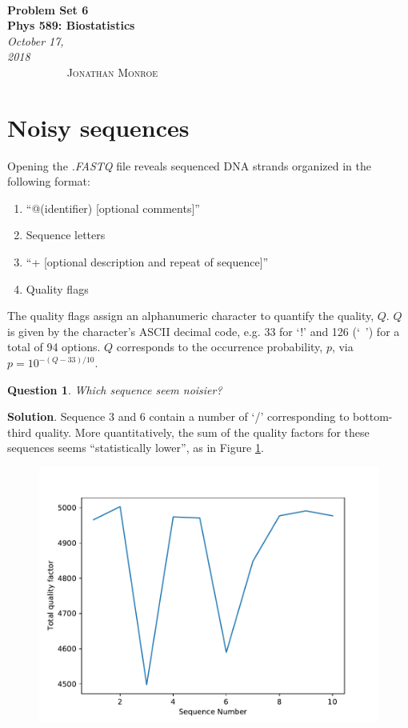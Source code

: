 \documentclass[12pt]{article}
\renewcommand{\=}[1]{\stackrel{#1}{=}} %
\newtheorem{p}{Question}[section]
\theoremstyle{definition}
\newenvironment{s}{%
        \begin{trivlist} \item \textbf{Solution}. }{%
			\end{trivlist}}%
\begin{document}
	
	{\noindent\Huge\bf  \\[0.5\baselineskip] {\selectfont  Problem Set 6}         }\\[2\baselineskip] %
	{ {\bf {}\selectfont Phys 589: Biostatistics}\\ {\textit{\selectfont     October 17, 2018}}}~~~~~~~~~~~~~~~~~~~~~~~~~~~~~~~~~~~~~~~~~~~~~~~~~~~~~~~~~~~~~~~~~~~~~~~~~~~~~    {\large \textsc{Jonathan Monroe}} %
	\\[1.4\baselineskip] 
	
	
	
	\section{Noisy sequences}
	{Opening the \textit{.FASTQ} file reveals sequenced DNA strands organized in the following format:
			\begin{enumerate}[\quad1.]
				\item ``@(identifier) [optional comments]''
				\item Sequence letters
				\item ``+ [optional description and repeat of sequence]''
				\item Quality flags
			\end{enumerate}	
			The quality flags assign an alphanumeric character to quantify the quality, $Q$. $Q$ is given by the character's ASCII decimal code, e.g. 33 for `!' and 126 (`~') for a total of 94 options. $Q$ corresponds to the occurrence probability, $p$, via $p=10^{-(Q-33)/10}$.
	}
	\begin{p} Which sequence seem noisier?
	\end{p}
	\begin{s} Sequence 3 and 6 contain a number of `/' corresponding to bottom-third quality. More quantitatively, the sum of the quality factors for these sequences seems ``statistically lower'', as in Figure  \ref{fig:qualitysequencenum}.
	\begin{figure}[h]
		\centering
		\includegraphics[width=0.4\linewidth]{figures/quality_sequenceNum}
		\caption{}
		\label{fig:qualitysequencenum}
	\end{figure}	
	\end{s}
\end{document}
